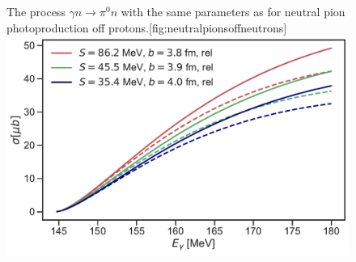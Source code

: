 \begin{figure}[H]
	\begin{sidecaption}{The process $\gamma n \rightarrow \pi^0 n$ with the same parameters as for neutral pion photoproduction off protons.}[fig:neutralpionsoffneutrons]
		\includegraphics[width=\linewidth]{Figures/NeutralPionsOffNeutrons.pdf}
	\end{sidecaption}
\end{figure}
